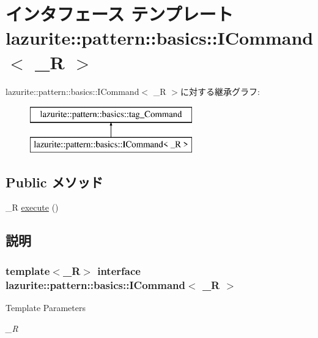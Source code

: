 \hypertarget{interfacelazurite_1_1pattern_1_1basics_1_1_i_command_3_01___r_01_4}{
\section{インタフェース テンプレート lazurite::pattern::basics::ICommand$<$ \_\-R $>$}
\label{interfacelazurite_1_1pattern_1_1basics_1_1_i_command_3_01___r_01_4}
}
lazurite::pattern::basics::ICommand$<$ \_\-R $>$に対する継承グラフ:\begin{figure}[H]
\begin{center}
\leavevmode
\includegraphics[height=2cm]{interfacelazurite_1_1pattern_1_1basics_1_1_i_command_3_01___r_01_4}
\end{center}
\end{figure}
\subsection*{Public メソッド}
\begin{DoxyCompactItemize}
\item 
\_\-R \hyperlink{interfacelazurite_1_1pattern_1_1basics_1_1_i_command_3_01___r_01_4_a6017a1753bb8c377fd8157353ac86c3d}{execute} ()
\end{DoxyCompactItemize}


\subsection{説明}
\subsubsection*{template$<$\_\-R$>$ interface lazurite::pattern::basics::ICommand$<$ \_\-R $>$}


\begin{DoxyTemplParams}{Template Parameters}
\item[{\em \_\-R}]\end{DoxyTemplParams}


